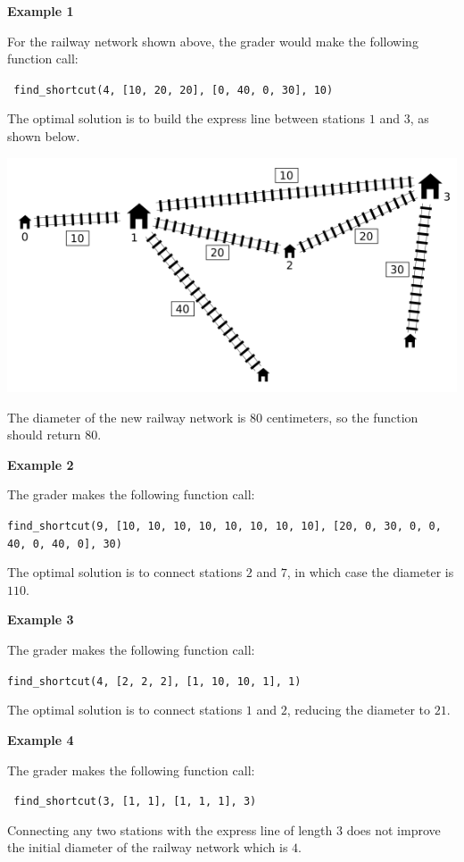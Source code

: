 \textbf{Example 1}

For the railway network shown above, the grader would make the following function call:

\texttt{ find\_shortcut(4, [10, 20, 20], [0, 40, 0, 30], 10)}

The optimal solution is to build the express line between stations $1$ and $3$, as shown below.

\includegraphics[scale=0.9]{2.png}

The diameter of the new railway network is $80$ centimeters, so the function should return $80$.

\textbf{Example 2}

The grader makes the following function call:

\texttt{find\_shortcut(9, [10, 10, 10, 10, 10, 10, 10, 10], [20, 0, 30, 0, 0, 40, 0, 40, 0], 30)}

The optimal solution is to connect stations $2$ and $7$, in which case the diameter is $110$.

\textbf{Example 3}

The grader makes the following function call:

\texttt{find\_shortcut(4, [2, 2, 2], [1, 10, 10, 1], 1)}

The optimal solution is to connect stations $1$ and $2$, reducing the diameter to $21$.

\textbf{Example 4}

The grader makes the following function call:

\texttt{ find\_shortcut(3, [1, 1], [1, 1, 1], 3) }

Connecting any two stations with the express line of length $3$ does not improve the initial diameter of the railway network which is $4$.
